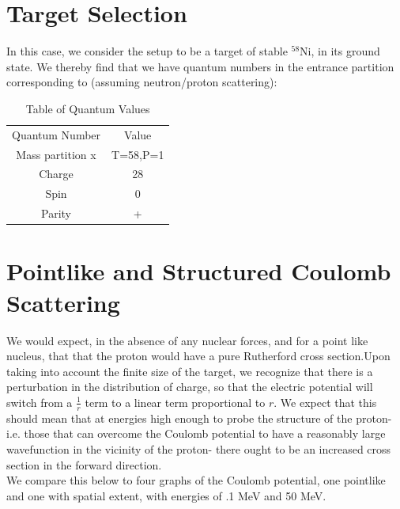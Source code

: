 \documentclass[paper=a4, fontsize=11pt]{scrartcl} %
\numberwithin{equation}{section} %
\numberwithin{figure}{section} %
\numberwithin{table}{section} %
\begin{document}
\section{Target Selection}

In this case, we consider the setup to be a target of stable $^{58}$Ni, in its ground state. We thereby find that we have quantum numbers in the entrance partition corresponding to (assuming neutron/proton scattering):\\
\begin{center}
\begin{table}[h!]
\captionsetup{font=large}
\caption{Table of Quantum Values}
\centering
\vspace{3 mm}
\begin{tabular}{|c|c|}

Quantum Number & Value \\
Mass partition x & T=58,P=1\\
Charge & 28 \\
Spin & 0\\
Parity & +


\end{tabular}
\end{table}
\end{center}



\section{Pointlike and Structured Coulomb Scattering}

We would expect, in the absence of any nuclear forces, and for a point like nucleus, that that the proton would have a pure Rutherford cross section.Upon taking into account the finite size of the target, we recognize that there is a perturbation in the distribution of charge, so that the electric potential will switch from a $\frac{1}{r}$ term to a linear term proportional to $r$. We expect that this should mean that at energies high enough to probe the structure of the proton-i.e. those that can overcome the Coulomb potential to have a reasonably large wavefunction in the vicinity of the proton- there ought to be an increased cross section in the forward direction. \\

We compare this below to four graphs of the Coulomb potential, one pointlike and one with spatial extent, with energies of .1 MeV and 50 MeV.\\
\end{document}
